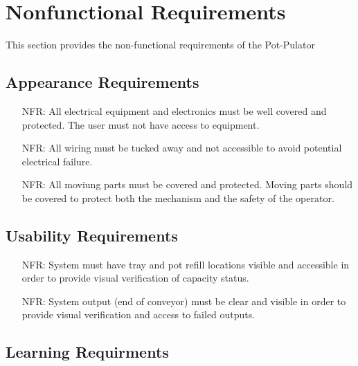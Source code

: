 \documentclass[12pt]{article}
\newcounter{nfrnum} %
\begin{document}
  
  
  
  \section{Nonfunctional Requirements}
  This section provides the non-functional requirements of the Pot-Pulator
  \subsection{Appearance Requirements}

  \noindent 
  \begin{itemize}
  
  \item[NFR\refstepcounter{nfrnum}\thenfrnum \label{NFR_Appearance1}:]
    All electrical equipment and electronics must be well covered and protected. The user must not have access to equipment.
  
  \item[NFR\refstepcounter{nfrnum}\thenfrnum \label{NFR_Appearance2}:]
    All wiring must be tucked away and not accessible to avoid potential electrical failure.
  
  \item[NFR\refstepcounter{nfrnum}\thenfrnum \label{NFR_Appearance3}:]
    All moviung parts must be covered and protected. Moving parts should be covered to protect both the mechanism and the safety of the operator.

  \end{itemize}
  
  \subsection{Usability Requirements}

  \noindent \begin{itemize}
  
  \item[NFR\refstepcounter{nfrnum}\thenfrnum \label{NFR_Usability1}:]
  System must have tray and pot refill locations visible and accessible in order to provide visual verification of capacity status.
  
  \item[NFR\refstepcounter{nfrnum}\thenfrnum \label{NFR_Usability2}:]
  System output (end of conveyor) must be clear and visible in order to provide visual verification and access to failed outputs.
  \end{itemize}
  \subsection{Learning Requirments}
\end{document}
